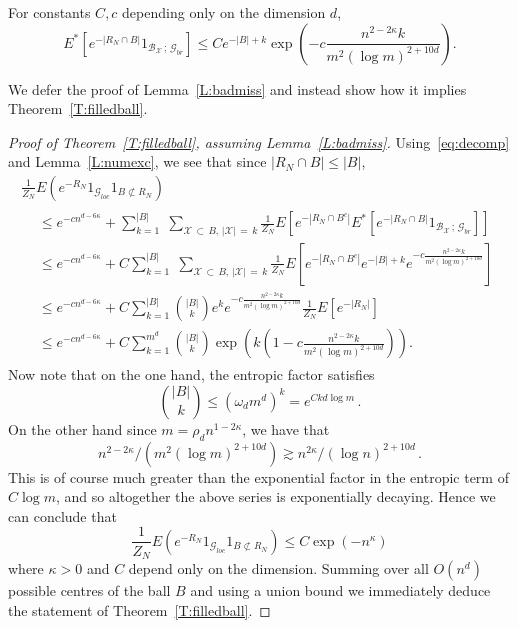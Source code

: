 \documentclass[AHL, Unicode, longabstracts, published]{cedram}
\newcommand*\E {{E}}
\newcommand{\cB}{\mathcal{B}}
\newcommand{\cG}{\mathcal{G}}
\newcommand{\cX}{\mathcal{X}}
\begin{document}
\begin{lemm}
For constants $C,c$ depending only on the dimension $d$,\label{L:badmiss}
\[
\E^*\left[e^{- | R_N\cap B| }1_{\cB_{\cX}\,;\,\cG_{br}} \right] \le Ce^{- |B| +k} \exp\left(- c \frac{n^{2 - 2\kappa} k}{ m^2(\log m)^{2+ 10d}}\right).
\]
\end{lemm}

We defer the proof of Lemma~\ref{L:badmiss} and instead show how it implies Theorem~\ref{T:filledball}.

\begin{proof}[Proof of Theorem~\ref{T:filledball}, assuming Lemma~\ref{L:badmiss}]
Using~\eqref{eq:decomp} and Lemma~\ref{L:numexc}, we see that since $|R_N\cap B| \le |B|$,
\begin{multline*}
\frac1{Z_N} \E\left(e^{ - R_N} 1_{ \cG_{loc}} 1_{B \not \subset R_N}\right) \\
\begin{aligned}
& \le e^{- cn^{d- 6\kappa}}+ \sum_{k=1}^{|B|}\; \sum_{\cX\,\subset\,B,\,|\cX|\,=\,k} \frac1{Z_N} \E\left[e^{ - |R_N\cap B^c|} \E^*\left[e^{- | R_N \cap B| }1_{\cB_{\cX}\,;\, \cG_{br}}\right] \right]
\\
& \le e^{ - cn^{d-6 \kappa }} + C\sum_{k=1}^{|B|}\;\sum_{\cX\,\subset\,B,\,|\cX|\,=\,k} \frac{1}{Z_N} \E\left[e^{ - |R_N\cap B^c|} e^{- |B| +k} e^{- c \frac{n^{2- 2\kappa} k}{ m^2(\log m)^{2+ 10d}} }\right]\\
& \le e^{ - cn^{d-6 \kappa}} + C \sum_{k=1}^{|B|} \binom{|B|}{k} e^k e^{- c \frac{n^{2- 2\kappa} k}{ m^2(\log m)^{2+ 10d}} } \frac{1}{Z_N} \E\left[e^{ - |R_N|}\right]\\
& \le e^{ - cn^{d-6 \kappa}} + C \sum_{k=1}^{m^d}\binom{|B|}{k} \exp\left(k (1 - c\frac{n^{2- 2\kappa} k}{ m^2(\log m)^{2+ 10d}})\right).
\end{aligned}
\end{multline*}
Now note that on the one hand, the entropic factor satisfies
\[
\binom{|B|}{k} \le (\omega_d m^{d})^k = e^{ C k d\log m}\,.
\]
On the other hand since $m = \rho_d n^{1-2\kappa}$, we have that
\[
n^{2 - 2\kappa} / \left(m^2 (\log m)^{2+ 10d}\right) \gtrsim n^{2\kappa}/(\log n)^{2+ 10d}\,.
\]
This is of course much greater than the exponential factor in the entropic term of $C \log m$, and so altogether the above series is exponentially decaying. Hence we can conclude that
\[
\frac1{Z_N}\E\left(e^{ - R_N} 1_{ \cG_{loc}} 1_{B \not \subset R_N}\right) \le C \exp(- n^{\kappa})
\]
where $\kappa>0$ and $C$ depend only on the dimension. Summing over all $O(n^d)$ possible centres of the ball $B$ and using a union bound we immediately deduce the statement of Theorem~\ref{T:filledball}.
\end{proof}
\end{document}
